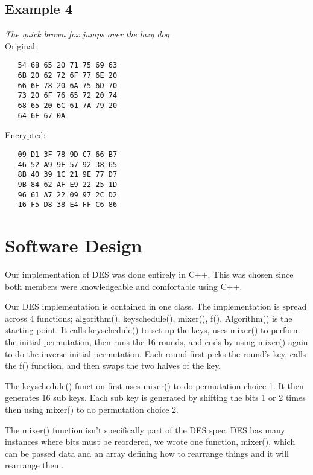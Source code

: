 \documentclass[10pt]{article}
\begin{document}
\subsection{Example 4}
\textit{The quick brown fox jumps over the lazy dog}
\\\indent Original:
\begin{verbatim}
   54 68 65 20 71 75 69 63
   6B 20 62 72 6F 77 6E 20
   66 6F 78 20 6A 75 6D 70
   73 20 6F 76 65 72 20 74
   68 65 20 6C 61 7A 79 20
   64 6F 67 0A
\end{verbatim}
\indent Encrypted:
\begin{verbatim}
   09 D1 3F 78 9D C7 66 B7
   46 52 A9 9F 57 92 38 65
   8B 40 39 1C 21 9E 77 D7
   9B 84 62 AF E9 22 25 1D
   96 61 A7 22 09 97 2C D2
   16 F5 D8 38 E4 FF C6 86
\end{verbatim}

\section{Software Design}
Our implementation of DES was done entirely in C++. This was chosen since both members were knowledgeable and comfortable using C++.

Our DES implementation is contained in one class. The implementation is spread across 4 functions; algorithm(), keyschedule(), mixer(), f(). Algorithm() is the starting point. It calls keyschedule() to set up the keys, uses mixer() to perform the initial permutation, then runs the 16 rounds, and ends by using mixer() again to do the inverse initial permutation.  Each round first picks the round's key, calls the f() function, and then swaps the two halves of the key.

The keyschedule() function first uses mixer() to do permutation choice 1.  It then generates 16 sub keys.  Each sub key is generated by shifting the bits 1 or 2 times then using mixer() to do permutation choice 2.

The mixer() function isn't specifically part of the DES spec. DES has many instances where bits must be reordered, we wrote one function, mixer(), which can be passed data and an array defining how to rearrange things and it will rearrange them.
\end{document}
